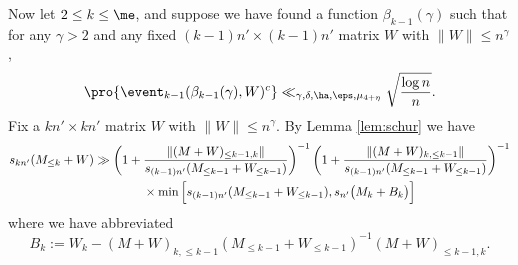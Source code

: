 \documentclass[aop,preprint]{imsart}
\theoremstyle{plain}
\theoremstyle{definition}
\theoremstyle{remark}
\numberwithin{equation}{section}
\numberwithin{theorem}{section}
\begin{document}
Now let $2\le k\le \me $, and suppose we have found a function $\beta_{k-1}(\gamma)$ such that for any $\gamma>2$ and any fixed $(k-1)n'\times (k-1)n'$ matrix $W$ with $\|W\|\le n^\gamma$, 
\begin{equation}
\pro{ \event_{k-1}(\beta_{k-1}(\gamma),W)^c} \ll_{\gamma,\delta,\ha,\eps,\mu_{4+\eta}} \sqrt{\frac{\log n}{n}}.
\end{equation}
Fix a $kn'\times kn'$ matrix $W$ with $\|W\|\le n^\gamma$.
By Lemma \ref{lem:schur} we have
\begin{align}
s_{kn'}( M_{\le k} + W) 
&\gg \left( 1+ \frac{\|(M+W)_{\le k-1, k}\|}{s_{(k-1)n'}(M_{\le k-1}+W_{\le k-1})}\right)^{-1}
\left( 1+ \frac{\|(M+W)_{k,\le k-1}\|}{s_{(k-1)n'}(M_{\le k-1}+W_{\le k-1})}\right)^{-1}	\notag\\
&\quad\quad\quad\quad \times \min\Big[ s_{(k-1)n'}(M_{\le k-1}+W_{\le k-1}) , s_{n'}\big(M_k + B_k\big)\Big]	\label{Mk:schur}
\end{align}
where we have abbreviated
\begin{equation}
B_k:=W_k -  (M+W)_{k,\le k-1}( M_{\le k-1} + W_{\le k-1})^{-1} (M+W)_{\le k-1,k} .
\end{equation}
\end{document}
